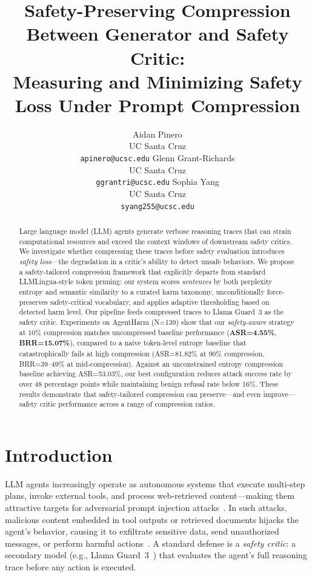 \documentclass[11pt]{article}
\title{Safety-Preserving Compression Between Generator and Safety Critic:\\
Measuring and Minimizing Safety Loss Under Prompt Compression}
\author{
  Aidan Pinero \\
  UC Santa Cruz \\
  \texttt{apinero@ucsc.edu} \And
  Glenn Grant-Richards \\
  UC Santa Cruz \\
  \texttt{ggrantri@ucsc.edu} \And
  Sophia Yang \\
  UC Santa Cruz \\
  \texttt{syang255@ucsc.edu}
}
\begin{document}
\maketitle

\begin{abstract}
Large language model (LLM) agents generate verbose reasoning traces that can strain computational resources and exceed the context windows of downstream safety critics. We investigate whether compressing these traces before safety evaluation introduces \textit{safety loss}---the degradation in a critic's ability to detect unsafe behaviors. We propose a safety-tailored compression framework that explicitly departs from standard LLMLingua-style token pruning: our system scores \textit{sentences} by both perplexity entropy and semantic similarity to a curated harm taxonomy, unconditionally force-preserves safety-critical vocabulary, and applies adaptive thresholding based on detected harm level. Our pipeline feeds compressed traces to Llama Guard~3 as the safety critic. Experiments on AgentHarm (N=139) show that our \textit{safety-aware} strategy at 10\% compression matches uncompressed baseline performance (\textbf{ASR=4.55\%}, \textbf{BRR=15.07\%}), compared to a naive token-level entropy baseline that catastrophically fails at high compression (ASR=81.82\% at 90\% compression, BRR=39--49\% at mid-compression). Against an unconstrained entropy compression baseline achieving ASR=53.03\%, our best configuration reduces attack success rate by over 48 percentage points while maintaining benign refusal rate below 16\%. These results demonstrate that safety-tailored compression can preserve---and even improve---safety critic performance across a range of compression ratios.
\end{abstract}

\section{Introduction}

LLM agents increasingly operate as autonomous systems that execute multi-step plans, invoke external tools, and process web-retrieved content---making them attractive targets for adversarial prompt injection attacks~\cite{agentdojo}. In such attacks, malicious content embedded in tool outputs or retrieved documents hijacks the agent's behavior, causing it to exfiltrate sensitive data, send unauthorized messages, or perform harmful actions~\cite{llmail}. A standard defense is a \textit{safety critic}: a secondary model (e.g., Llama Guard~3~\cite{inan2023llamaguard}) that evaluates the agent's full reasoning trace before any action is executed.
\end{document}
